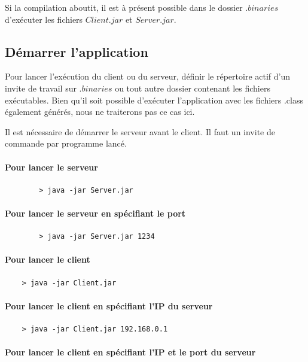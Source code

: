 \documentclass[10pt,a4paper]{article}
\begin{document}
	Si la compilation aboutit, il est à présent possible dans le dossier $.binaries$ d'exécuter les fichiers $Client.jar$ et $Server.jar$.
	
	\subsection{Démarrer l'application} \label{sub:execution}
	
	Pour lancer l'exécution du client ou du serveur, définir le répertoire actif d'un invite de travail sur $.binaries$ ou tout autre dossier contenant les fichiers exécutables. Bien qu'il soit possible d'exécuter l'application avec les fichiers .class également générés, nous ne traiterons pas ce cas ici.
	
	Il est nécessaire de démarrer le serveur avant le client. Il faut un invite de commande par programme lancé.
	
	\paragraph{Pour lancer le serveur}
	\begin{verbatim}
		> java -jar Server.jar
	\end{verbatim}
	
	\paragraph{Pour lancer le serveur en spécifiant le port}
	\begin{verbatim}
		> java -jar Server.jar 1234
	\end{verbatim}
	
	\paragraph{Pour lancer le client}
	\begin{verbatim}
	> java -jar Client.jar
	\end{verbatim}
	
	\paragraph{Pour lancer le client en spécifiant l'IP du serveur}
	\begin{verbatim}
	> java -jar Client.jar 192.168.0.1
	\end{verbatim}
	
	\paragraph{Pour lancer le client en spécifiant l'IP et le port du serveur} 
	
\end{document}
